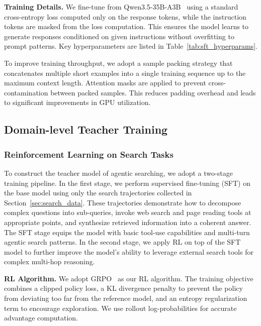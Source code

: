 

\textbf{Training Details.} We fine-tune from Qwen3.5-35B-A3B~\citep{Qwen3.5} using a standard cross-entropy loss computed only on the response tokens, while the instruction tokens are masked from the loss computation. This ensures the model learns to generate responses conditioned on given instructions without overfitting to prompt patterns. Key hyperparameters are listed in Table~\ref{tab:sft_hyperparams}.



To improve training throughput, we adopt a sample packing strategy that concatenates multiple short examples into a single training sequence up to the maximum context length. Attention masks are applied to prevent cross-contamination between packed samples. This reduces padding overhead and leads to significant improvements in GPU utilization. 

\subsection{Domain-level Teacher Training}
\label{sec:domain-level}

\subsubsection{Reinforcement Learning on Search Tasks}
To construct the teacher model of agentic searching, we adopt a two-stage training pipeline. In the first stage, we perform supervised fine-tuning (SFT) on the base model using only the search trajectories collected in Section~\ref{sec:search_data}. These trajectories demonstrate how to decompose complex questions into sub-queries, invoke web search and page reading tools at appropriate points, and synthesize retrieved information into a coherent answer. The SFT stage equips the model with basic tool-use capabilities and multi-turn agentic search patterns. In the second stage, we apply RL on top of the SFT model to further improve the model's ability to leverage external search tools for complex multi-hop reasoning.

\textbf{RL Algorithm.} We adopt GRPO~\citep{shao2024deepseekmath} as our RL algorithm. The training objective combines a clipped policy loss, a KL divergence penalty to prevent the policy from deviating too far from the reference model, and an entropy regularization term to encourage exploration. We use rollout log-probabilities for accurate advantage computation.

